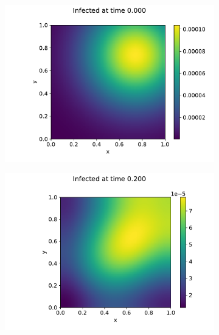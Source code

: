 \begin{figure}
    \centering
    \begin{subfigure}[b]{0.49\linewidth}
        \centering
        \includegraphics[width=\textwidth]{report/Images/plots/plot-i_t=0-1.pdf}
    \end{subfigure}
    \hfill
    \begin{subfigure}[b]{0.49\linewidth}
        \centering
        \includegraphics[width=\textwidth]{report/Images/plots/plot-i_t=2000-1.pdf}
    \end{subfigure}
    \begin{subfigure}[b]{0.49\linewidth}
        \centering

\end{subfigure}
\end{figure}

